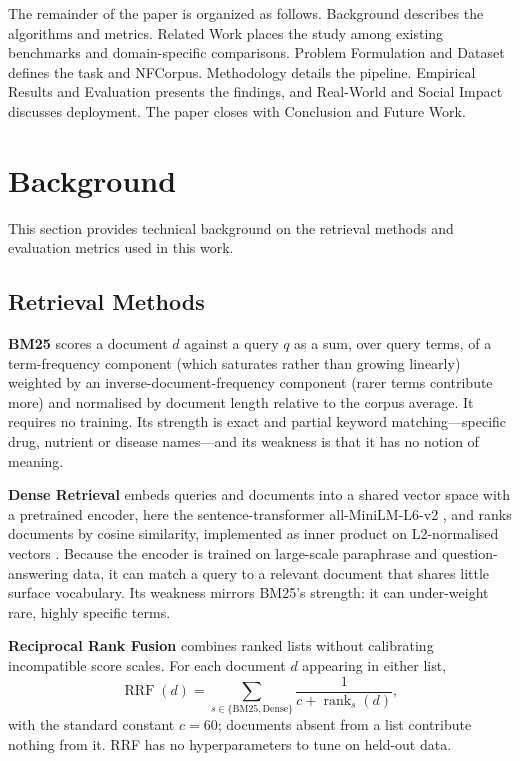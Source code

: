 \documentclass[10pt,letterpaper,twocolumn]{article}
\newcommand{\RRF}{\operatorname{RRF}}
\begin{document}
The remainder of the paper is organized as follows. Background describes the algorithms and metrics. Related Work places the study among existing benchmarks and domain-specific comparisons. Problem Formulation and Dataset defines the task and NFCorpus. Methodology details the pipeline. Empirical Results and Evaluation presents the findings, and Real-World and Social Impact discusses deployment. The paper closes with Conclusion and Future Work.

\section{Background}
This section provides technical background on the retrieval methods and evaluation metrics used in this work.

\subsection{Retrieval Methods}
\textbf{BM25} \citep{robertson2009} scores a document $d$ against a query $q$ as a sum, over query terms, of a term-frequency component (which saturates rather than growing linearly) weighted by an inverse-document-frequency component (rarer terms contribute more) and normalised by document length relative to the corpus average. It requires no training. Its strength is exact and partial keyword matching---specific drug, nutrient or disease names---and its weakness is that it has no notion of meaning.

\textbf{Dense Retrieval} embeds queries and documents into a shared vector space with a pretrained encoder, here the sentence-transformer all-MiniLM-L6-v2 \citep{reimers2019}, and ranks documents by cosine similarity, implemented as inner product on L2-normalised vectors \citep[as in][]{karpukhin2020}. Because the encoder is trained on large-scale paraphrase and question-answering data, it can match a query to a relevant document that shares little surface vocabulary. Its weakness mirrors BM25's strength: it can under-weight rare, highly specific terms.

\textbf{Reciprocal Rank Fusion} \citep{cormack2009} combines ranked lists without calibrating incompatible score scales. For each document $d$ appearing in either list,
\begin{equation}
\RRF(d)=\sum_{s\in\{\text{BM25},\text{Dense}\}}\frac{1}{c+\operatorname{rank}_s(d)},
\label{eq:rrf}
\end{equation}
with the standard constant $c=60$; documents absent from a list contribute nothing from it. RRF has no hyperparameters to tune on held-out data.
\end{document}
